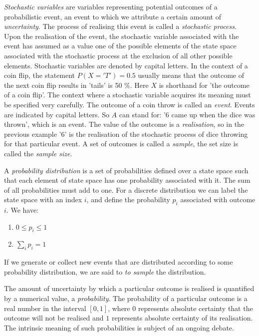   
\emph{Stochastic variables} are variables representing potential outcomes of a
probabilistic event, an event to which we attribute a certain amount of
\emph{uncertainty}. The process of realising this event is called a \emph{stochastic process}.
Upon the realisation of the event, the stochastic variable associated
with the event has assumed as a value one of the possible elements of the
state space associated with the stochastic process at the exclusion of all other
possible elements. Stochastic variables are denoted by capital letters. In the context
of a coin flip, the statement $P(X='T') = 0.5$ usually means that the outcome
of the next coin flip results in 'tails' is 50 \%. Here $X$ is shorthand for
'the outcome of a coin flip'. The context where a stochastic variable
acquires its meaning must be specified very carefully. The outcome of a coin throw
is called an \emph{event}. Events are indicated by capital letters. So $A$ can stand
for: '6 came up when the dice was thrown', which is an  event. The value of the
outcome is a \emph{realisation}, so in the previous example '6' is the realisation
of the stochastic process of dice throwing for that particular event. A set of
outcomes is called a \emph{sample}, the set size is called
the \emph{sample size}.

A \emph{probability distribution} is a set of probabilities defined over a state
space such that each element of state space has one probability associated with it.
The sum of all probabilities must add to one.  
For a discrete distribution we can label the state space with an index $i$, and
define the probability $p_i$ associated with outcome $i$. We have:
\begin{enumerate}
\item $0 \le p_i \le 1$
\item $\sum_i p_i = 1$ 
\end{enumerate}


  
If we generate or collect new events that are distributed according to some
probability distribution, we are said to \emph{to sample} the distribution.
  
The amount of uncertainty by which a particular outcome is realised is quantified
by a numerical value, a \emph{probability}. The probability of a particular outcome
is a real number in the interval $[0,1]$, where $0$ represents absolute certainty
that the outcome will not be realised and $1$ represents absolute certainty of its
realisation. The intrinsic meaning of such probabilities is subject of an ongoing
debate.
  
